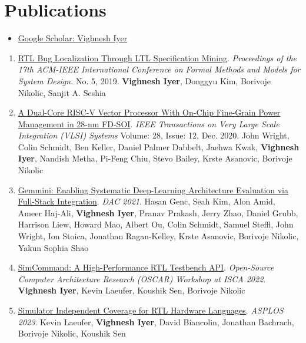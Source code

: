 \documentclass[10pt]{article}
\begin{document}
\section{Publications}

\begin{itemize}
    \item \href{https://scholar.google.com/citations?user=0qawpQkAAAAJ&hl=en&oi=ao}{Google Scholar: Vighnesh Iyer}
\end{itemize}

\begin{enumerate}
    \item \href{https://dl.acm.org/citation.cfm?id=3361202}{RTL Bug Localization Through LTL Specification Mining}. \textit{Proceedings of the 17th ACM-IEEE International Conference on Formal Methods and Models for System Design.} No. 5, 2019. \textbf{Vighnesh Iyer}, Donggyu Kim, Borivoje Nikolic, Sanjit A. Seshia
    \item \href{https://ieeexplore.ieee.org/document/9241430}{A Dual-Core RISC-V Vector Processor With On-Chip Fine-Grain Power Management in 28-nm FD-SOI}. \textit{IEEE Transactions on Very Large Scale Integration (VLSI) Systems} Volume: 28, Issue: 12, Dec. 2020. John Wright, Colin Schmidt, Ben Keller, Daniel Palmer Dabbelt, Jaehwa Kwak, \textbf{Vighnesh Iyer}, Nandish Metha, Pi-Feng Chiu, Stevo Bailey, Krste Asanovic, Borivoje Nikolic
    \item \href{https://people.eecs.berkeley.edu/~ysshao/assets/papers/genc2021-dac.pdf}{Gemmini: Enabling Systematic Deep-Learning Architecture Evaluation via Full-Stack Integration}. \textit{DAC 2021}. Hasan Genc, Seah Kim, Alon Amid, Ameer Haj-Ali, \textbf{Vighnesh Iyer}, Pranav Prakash, Jerry Zhao, Daniel Grubb, Harrison Liew, Howard Mao, Albert Ou, Colin Schmidt, Samuel Steffl, John Wright, Ion Stoica, Jonathan Ragan-Kelley, Krste Asanovic, Borivoje Nikolic, Yakun Sophia Shao
    \item \href{https://oscar-workshop.github.io/files/SimCommand_A_High_Performance_RTL_Testbench_API-OSCAR22.pdf}{SimCommand: A High-Performance RTL Testbench API}. \textit{Open-Source Computer Architecture Research (OSCAR) Workshop at ISCA 2022}. \textbf{Vighnesh Iyer}, Kevin Laeufer, Koushik Sen, Borivoje Nikolic
    \item \href{https://dl.acm.org/doi/10.1145/3582016.3582019}{Simulator Independent Coverage for RTL Hardware Languages}. \textit{ASPLOS 2023}. Kevin Laeufer, \textbf{Vighnesh Iyer}, David Biancolin, Jonathan Bachrach, Borivoje Nikolic, Koushik Sen

\end{enumerate}
\end{document}

